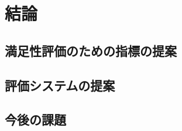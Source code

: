 \chapter{結論}
\label{chap:conclusion}

\section{満足性評価のための指標の提案}

\section{評価システムの提案}

\section{今後の課題}

